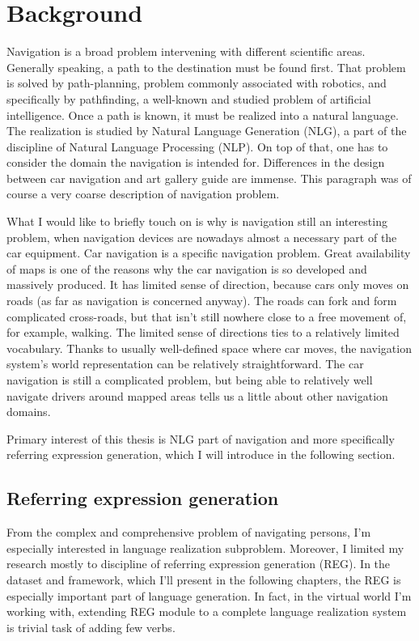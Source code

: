 \chapter{Background}
\label{chap:bg}
Navigation is a broad problem intervening with different scientific areas. Generally speaking, a path to the destination must be found first. That problem is solved by path-planning, problem commonly associated with robotics, and specifically by pathfinding, a well-known and studied problem of artificial intelligence. Once a path is known, it must be realized into a natural language. The realization is studied by Natural Language Generation (NLG), a part of the discipline of Natural Language Processing (NLP). On top of that, one has to consider the domain the navigation is intended for. Differences in the design between car navigation and art gallery guide are immense. This paragraph was of course a very coarse description of navigation problem.

What I would like to briefly touch on is why is navigation still an interesting problem, when navigation devices are nowadays almost a necessary part of the car equipment. Car navigation is a specific navigation problem. Great availability of maps is one of the reasons why the car navigation is so developed and massively produced. It has limited sense of direction, because cars only moves on roads (as far as navigation is concerned anyway). The roads can fork and form complicated cross-roads, but that isn't still nowhere close to a free movement of, for example, walking. The limited sense of directions ties to a relatively limited vocabulary. Thanks to usually well-defined space where car moves, the navigation system's world representation can be relatively straightforward. The car navigation is still a complicated problem, but being able to relatively well navigate drivers around mapped areas tells us a little about other navigation domains.

Primary interest of this thesis is NLG part of navigation and more specifically referring expression generation, which I will introduce in the following section.  


\section{Referring expression generation}
\label{sec:bg-reg}
From the complex and comprehensive problem of navigating persons, I'm especially interested in language realization subproblem. Moreover, I limited my research mostly to discipline of referring expression generation (REG). In the dataset and framework, which I'll present in the following chapters, the REG is especially important part of language generation. In fact, in the virtual world I'm working with, extending REG module to a complete language realization system is trivial task of adding few verbs.

